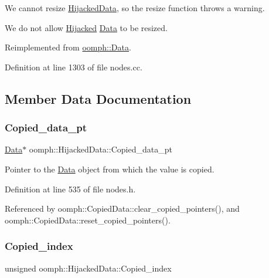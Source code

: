 We cannot resize \hyperlink{classoomph_1_1HijackedData}{Hijacked\+Data}, so the resize function throws a warning. 

We do not allow \hyperlink{classoomph_1_1Hijacked}{Hijacked} \hyperlink{classoomph_1_1Data}{Data} to be resized. 

Reimplemented from \hyperlink{classoomph_1_1Data_ac68583834c9bef47f5c37c890960e186}{oomph\+::\+Data}.



Definition at line 1303 of file nodes.\+cc.



\subsection{Member Data Documentation}
\mbox{\label{classoomph_1_1HijackedData_a19ec740b0ea8dc8cafc5aff3836a01cb}} 
\subsubsection{\texorpdfstring{Copied\+\_\+data\+\_\+pt}{Copied\_data\_pt}}
{\footnotesize\ttfamily \hyperlink{classoomph_1_1Data}{Data}$\ast$ oomph\+::\+Hijacked\+Data\+::\+Copied\+\_\+data\+\_\+pt\hspace{0.3cm}{\ttfamily [private]}}



Pointer to the \hyperlink{classoomph_1_1Data}{Data} object from which the value is copied. 



Definition at line 535 of file nodes.\+h.



Referenced by oomph\+::\+Copied\+Data\+::clear\+\_\+copied\+\_\+pointers(), and oomph\+::\+Copied\+Data\+::reset\+\_\+copied\+\_\+pointers().

\mbox{\label{classoomph_1_1HijackedData_ac033302cfc0833e251501eae1e10001f}} 
\subsubsection{\texorpdfstring{Copied\+\_\+index}{Copied\_index}}
{\footnotesize\ttfamily unsigned oomph\+::\+Hijacked\+Data\+::\+Copied\+\_\+index\hspace{0.3cm}{\ttfamily [private]}}



